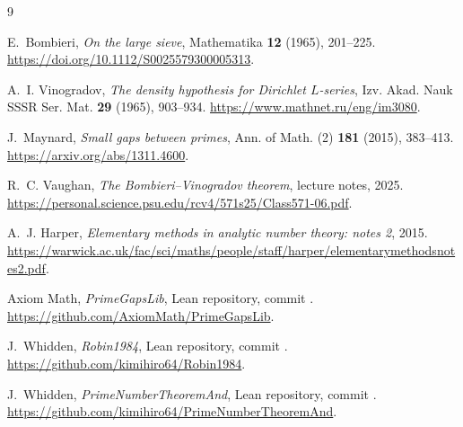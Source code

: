 \documentclass[11pt]{amsart}
\theoremstyle{definition}
\theoremstyle{remark}
\begin{document}
\begin{thebibliography}{9}

E.~Bombieri,
\emph{On the large sieve},
Mathematika \textbf{12} (1965), 201--225.
\url{https://doi.org/10.1112/S0025579300005313}.

A.~I. Vinogradov,
\emph{The density hypothesis for Dirichlet $L$-series},
Izv. Akad. Nauk SSSR Ser. Mat. \textbf{29} (1965), 903--934.
\url{https://www.mathnet.ru/eng/im3080}.

J.~Maynard,
\emph{Small gaps between primes},
Ann. of Math. (2) \textbf{181} (2015), 383--413.
\url{https://arxiv.org/abs/1311.4600}.

R.~C. Vaughan,
\emph{The Bombieri--Vinogradov theorem}, lecture notes, 2025.
\url{https://personal.science.psu.edu/rcv4/571s25/Class571-06.pdf}.

A.~J. Harper,
\emph{Elementary methods in analytic number theory: notes 2}, 2015.
\url{https://warwick.ac.uk/fac/sci/maths/people/staff/harper/elementarymethodsnotes2.pdf}.

Axiom Math,
\emph{PrimeGapsLib}, Lean repository, commit
.
\url{https://github.com/AxiomMath/PrimeGapsLib}.

J.~Whidden,
\emph{Robin1984}, Lean repository, commit
.
\url{https://github.com/kimihiro64/Robin1984}.

J.~Whidden,
\emph{PrimeNumberTheoremAnd}, Lean repository, commit
.
\url{https://github.com/kimihiro64/PrimeNumberTheoremAnd}.

\end{thebibliography}
\end{document}
